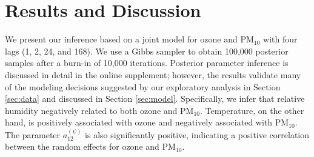 \documentclass[alpha-refs]{wiley-article}
\newcommand{\bbeta}{ \mbox{\boldmath $ \beta $} }
\newcommand{\bS}{\textbf{S}}
\begin{document}
%

\section{Results and Discussion}\label{sec:res}

We present our inference based on a joint model for ozone and $\text{PM}_{10}$ with four lags (1, 2, 24, and 168). We use a Gibbs sampler to obtain 100,000 posterior samples after a burn-in of 10,000 iterations. Posterior parameter inference is discussed in detail in the online supplement; however, the results validate many of the modeling decisions suggested by our exploratory analysis in Section \ref{sec:data} and discussed in Section \ref{sec:model}. Specifically, we infer that relative humidity negatively related to both ozone and $\text{PM}_{10}$. Temperature, on the other hand, is positively associated with ozone and negatively associated with $\text{PM}_{10}$. The parameter $a_{12}^{(\psi)}$ is also significantly positive, indicating a positive correlation between the random effects for ozone and $\text{PM}_{10}$.
\end{document}
